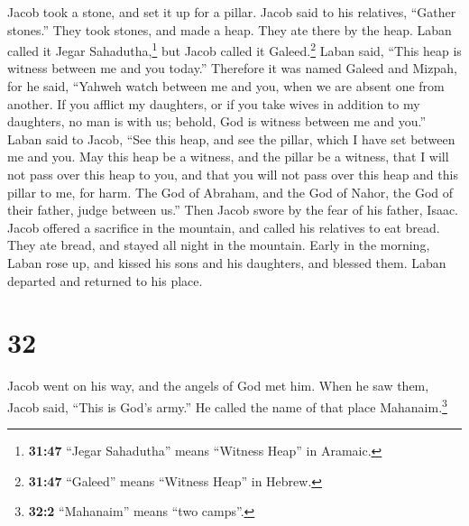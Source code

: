  Jacob took a stone, and set it up for a pillar.
 Jacob said to his relatives, ``Gather stones.'' They
took stones, and made a heap. They ate there by the heap.
 Laban called it Jegar Sahadutha,\footnote{\textbf{31:47}
  ``Jegar Sahadutha'' means ``Witness Heap'' in Aramaic.} but Jacob
called it Galeed.\footnote{\textbf{31:47} ``Galeed'' means ``Witness
  Heap'' in Hebrew.}  Laban said, ``This heap is witness
between me and you today.'' Therefore it was named Galeed
 and Mizpah, for he said, ``Yahweh watch between me and
you, when we are absent one from another.  If you afflict
my daughters, or if you take wives in addition to my daughters, no man
is with us; behold, God is witness between me and you.'' 
Laban said to Jacob, ``See this heap, and see the pillar, which I have
set between me and you.  May this heap be a witness, and
the pillar be a witness, that I will not pass over this heap to you, and
that you will not pass over this heap and this pillar to me, for harm.
 The God of Abraham, and the God of Nahor, the God of
their father, judge between us.'' Then Jacob swore by the fear of his
father, Isaac.  Jacob offered a sacrifice in the
mountain, and called his relatives to eat bread. They ate bread, and
stayed all night in the mountain.  Early in the morning,
Laban rose up, and kissed his sons and his daughters, and blessed them.
Laban departed and returned to his place.

\hypertarget{section-31}{%
\section{32}\label{section-31}}

 Jacob went on his way, and the angels of God met him.
 When he saw them, Jacob said, ``This is God's army.'' He
called the name of that place Mahanaim.\footnote{\textbf{32:2}
  ``Mahanaim'' means ``two camps''.}

